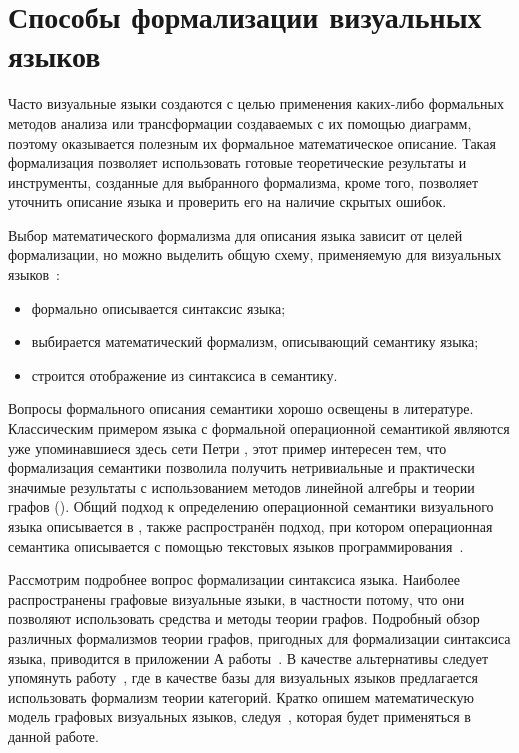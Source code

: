 \section{Способы формализации визуальных языков}
Часто визуальные языки создаются с целью применения каких-либо формальных методов анализа
или трансформации создаваемых с их помощью диаграмм, поэтому оказывается полезным
их формальное математическое описание. Такая формализация позволяет использовать 
готовые теоретические результаты и инструменты, созданные для выбранного формализма,
кроме того, позволяет уточнить описание языка и проверить его на наличие скрытых ошибок.

Выбор математического формализма для описания языка зависит от целей формализации,
но можно выделить общую схему, применяемую для визуальных языков~\cite{harel2004semantics,france1998uml}:
\begin{itemize}
	\item формально описывается синтаксис языка;
	\item выбирается математический формализм, описывающий семантику языка;
	\item строится отображение из синтаксиса в семантику.
\end{itemize}

Вопросы формального описания семантики хорошо освещены в литературе. Классическим примером 
языка с формальной операционной семантикой являются уже упоминавшиеся здесь сети Петри
\cite{murata1989petri}, этот пример интересен тем, что формализация семантики позволила
получить нетривиальные и практически значимые результаты с использованием методов линейной 
алгебры и теории графов (\cite{yen2006petri,kotb2007multiagent,chang2013learning,costelha2010petri}).
Общий подход к определению операционной семантики визуального языка описывается в
\cite{combemale2012executable}, также распространён подход, при котором операционная 
семантика описывается с помощью текстовых языков программирования~\cite{sadilek2009eprovide}.

Рассмотрим подробнее вопрос формализации синтаксиса языка. Наиболее распространены 
графовые визуальные языки, в частности потому, что они позволяют использовать средства и
методы теории графов. Подробный обзор различных формализмов теории графов, пригодных для
формализации синтаксиса языка, приводится в приложении А работы~\cite{sukhov2013disser}.
В качестве альтернативы следует упомянуть работу~\cite{diskin2000arrow}, где в качестве
базы для визуальных языков предлагается использовать формализм теории категорий. Кратко 
опишем математическую модель графовых визуальных языков, следуя~\cite{sukhov2013disser},
которая будет применяться в данной работе.

